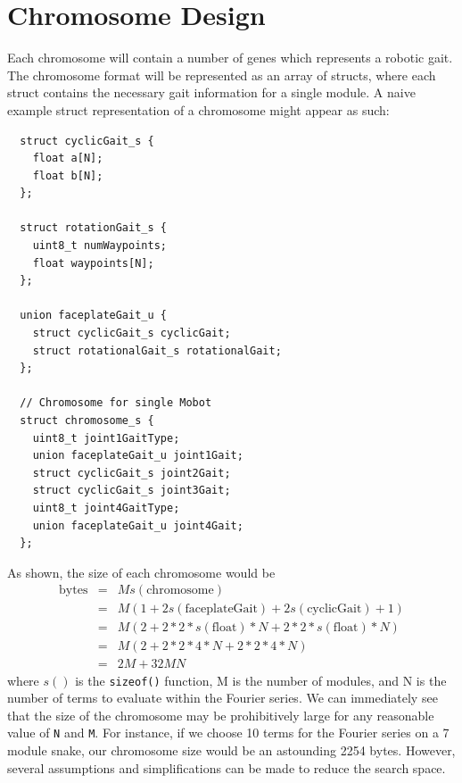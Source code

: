 \section{Chromosome Design}
  Each chromosome will contain a number of genes which represents a robotic gait. 
  The chromosome format will be represented as an array of structs, where
  each struct contains the necessary gait information for a single module.
  A naive example struct representation of a chromosome might appear as such:
  \begin{verbatim}
  struct cyclicGait_s {
    float a[N];
    float b[N];
  };

  struct rotationGait_s {
    uint8_t numWaypoints;
    float waypoints[N];
  };

  union faceplateGait_u {
    struct cyclicGait_s cyclicGait;
    struct rotationalGait_s rotationalGait;
  };

  // Chromosome for single Mobot
  struct chromosome_s {
    uint8_t joint1GaitType;
    union faceplateGait_u joint1Gait;
    struct cyclicGait_s joint2Gait;
    struct cyclicGait_s joint3Gait;
    uint8_t joint4GaitType;
    union faceplateGait_u joint4Gait;
  };
  \end{verbatim}

  As shown, the size of each chromosome would be 
  \begin{eqnarray*}
  \mathrm{bytes} &=& M s(\mathrm{chromosome}) \\
  &=& M ( 1 + 2 s(\mathrm{faceplateGait}) + 2 s(\mathrm{cyclicGait}) + 1) \\
  &=& M (2 + 2*2*s(\mathrm{float})*N + 2*2*s(\mathrm{float})*N) \\
  &=& M (2 + 2*2*4*N + 2*2*4*N) \\
  &=& 2M + 32MN
  \end{eqnarray*}
  where $s()$ is the \texttt{sizeof()} function, M is the number of modules, and N is
  the number of terms to evaluate within the Fourier series.
  We can immediately see that the size of the chromosome may be prohibitively large for any reasonable value
  of \texttt{N} and \texttt{M}. For instance, if we choose 10 terms for the Fourier series
  on a 7 module snake, our chromosome size would be an astounding 2254 bytes. However,
  several assumptions and simplifications can be made to reduce the search space. 

